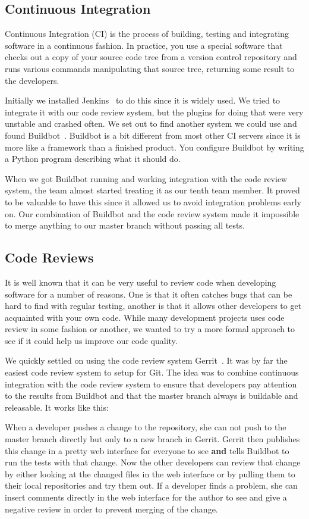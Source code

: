 \documentclass[11pt,a4paper]{report}
\begin{document}
\subsection{Continuous Integration}
Continuous Integration (CI) is the process of building, testing and integrating
software in a continuous fashion. In practice, you use a special software that
checks out a copy of your source code tree from a version control repository and
runs various commands manipulating that source tree, returning some result to
the developers.

Initially we installed Jenkins~\cite{jenkins_ci} to do this since it is widely used. We tried to
integrate it with our code review system, but the plugins for doing that were
very unstable and crashed often. We set out to find another system we could use
and found Buildbot~\cite{buildbot}. Buildbot is a bit different from most other CI servers since
it is more like a framework than a finished product. You configure Buildbot by
writing a Python program describing what it should do.

When we got Buildbot running and working integration with the code review
system, the team almost started treating it as our tenth team member. It proved
to be valuable to have this since it allowed us to avoid integration problems
early on. Our combination of Buildbot and the code review system made it
impossible to merge anything to our master branch without passing all tests.
\subsection{Code Reviews}
It is well known that it can be very useful to review code when developing
software for a number of reasons. One is that it often catches bugs that can be
hard to find with regular testing, another is that it allows other developers to
get acquainted with your own code. While many development projects uses code
review in some fashion or another, we wanted to try a more formal approach to
see if it could help us improve our code quality.

We quickly settled on using the code review system Gerrit~\cite{gerrit_cr}. It was by far the
easiest code review system to setup for Git. The idea was to combine continuous
integration with the code review system to ensure that developers pay attention
to the results from Buildbot and that the master branch always is buildable and
releasable. It works like this:

When a developer pushes a change to the repository, she can not push to the
master branch directly but only to a new branch in Gerrit. Gerrit then publishes
this change in a pretty web interface for everyone to see {\bf and} tells
Buildbot to run the tests with that change. Now the other developers can review
that change by either looking at the changed files in the web interface or by
pulling them to their local repositories and try them out. If a developer finds
a problem, she can insert comments directly in the web interface for the author
to see and give a negative review in order to prevent merging of the change.
\end{document}
